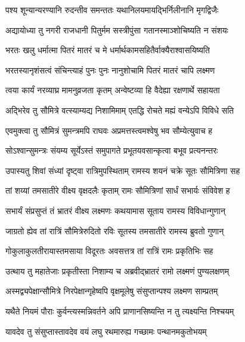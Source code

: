 \twolineshloka
{पश्य शून्यान्यरण्यानि रुदन्तीव समन्ततः}
{यथानिलयमायद्भिर्निलीनानि मृगद्विजैः} %

\twolineshloka
{अद्यायोध्या तु नगरी राजधानी पितुर्मम}
{सस्त्रीपुंसा गतानस्माञ्शोचिष्यति न संशयः} %

\twolineshloka
{भरतः खलु धर्मात्मा पितरं मातरं च मे}
{धर्मार्थकामसहितैर्वाक्यैराश्वासयिष्यति} %

\twolineshloka
{भरतस्यानृशंसत्वं संचिन्त्याहं पुनः पुनः}
{नानुशोचामि पितरं मातरं चापि लक्ष्मण} %

\twolineshloka
{त्वया कार्यं नरव्याघ्र मामनुव्रजता कृतम्}
{अन्वेष्टव्या हि वैदेह्या रक्षणार्थे सहायता} %

\twolineshloka
{अद्भिरेव तु सौमित्रे वत्स्याम्यद्य निशामिमाम्}
{एतद्धि रोचते मह्यं वन्येऽपि विविधे सति} %

\twolineshloka
{एवमुक्त्वा तु सौमित्रं सुमन्त्रमपि राघवः}
{अप्रमत्तस्त्वमश्वेषु भव सौम्येत्युवाच ह} %

\twolineshloka
{सोऽश्वान्सुमन्त्रः संयम्य सूर्येऽस्तं समुपागते}
{प्रभूतयवसान्कृत्वा बभूव प्रत्यनन्तरः} %

\twolineshloka
{उपास्यतु शिवां संध्यां दृष्ट्वा रात्रिमुपस्थिताम्}
{रामस्य शयनं चक्रे सूतः सौमित्रिणा सह} %

\twolineshloka
{तां शय्यां तमसातीरे वीक्ष्य वृक्षदलैः कृताम्}
{रामः सौमित्रिणां सार्धं सभार्यः संविवेश ह} %

\twolineshloka
{सभार्यं संप्रसुप्तं तं भ्रातरं वीक्ष्य लक्ष्मणः}
{कथयामास सूताय रामस्य विविधान्गुणान्} %

\twolineshloka
{जाग्रतो ह्येव तां रात्रिं सौमित्रेरुदितो रविः}
{सूतस्य तमसातीरे रामस्य ब्रुवतो गुणान्} %

\twolineshloka
{गोकुलाकुलतीरायास्तमसाया विदूरतः}
{अवसत्तत्र तां रात्रिं रामः प्रकृतिभिः सह} %

\twolineshloka
{उत्थाय तु महातेजाः प्रकृतीस्ता निशाम्य च}
{अब्रवीद्भ्रातरं रामो लक्ष्मणं पुण्यलक्षणम्} %

\twolineshloka
{अस्मद्व्यपेक्षान्सौमित्रे निरपेक्षान्गृहेष्वपि}
{वृक्षमूलेषु संसुप्तान्पश्य लक्ष्मण साम्प्रतम्} %

\twolineshloka
{यथैते नियमं पौराः कुर्वन्त्यस्मन्निवर्तने}
{अपि प्राणानसिष्यन्ति न तु त्यक्ष्यन्ति निश्चयम्} %

\twolineshloka
{यावदेव तु संसुप्तास्तावदेव वयं लघु}
{रथमारुह्य गच्छामः पन्थानमकुतोभयम्} %

